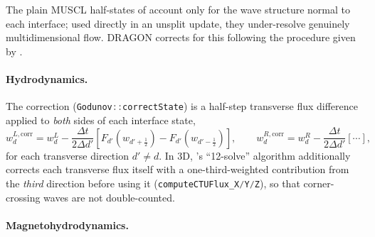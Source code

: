\documentclass[11pt]{report}
\newcommand{\cpp}[1]{\lstinline[language=C++]{#1}}
\begin{document}
The plain MUSCL half-states of  account only for the wave structure normal to each interface; used directly in an unsplit update, they under-resolve genuinely multidimensional flow. 
DRAGON corrects for this following the procedure given by \citet{GardinerStone2008}.


\paragraph{Hydrodynamics.}

 The correction (\cpp{Godunov::correctState}) is a half-step transverse flux difference applied to \emph{both} sides of each interface state,
\begin{equation}
w^{L,\mathrm{corr}}_{d} = w^{L}_{d} - \frac{\Delta t}{2\Delta d'} \left[F_{d'}(w_{d'+\frac12}) - F_{d'}(w_{d'-\frac12})\right],
\qquad w^{R,\mathrm{corr}}_{d} = w^{R}_{d} - \frac{\Delta t}{2\Delta d'} \left[\cdots\right], \end{equation}
for each transverse direction $d' \ne d$. 
In 3D, \citet{GardinerStone2008}'s ``12-solve'' algorithm additionally corrects each transverse flux itself with a one-third-weighted contribution from the \emph{third} direction before using it (\cpp{computeCTUFlux_X/Y/Z}), so that corner-crossing waves are not double-counted.


\paragraph{Magnetohydrodynamics.} 
\end{document}
